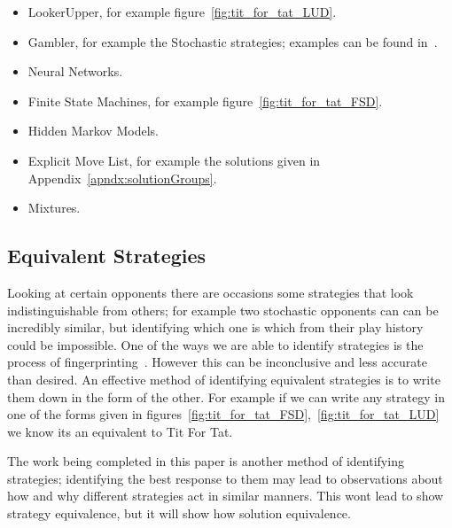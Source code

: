 \begin{itemize}
 \item LookerUpper, for example figure~\ref{fig:tit_for_tat_LUD}.
 \item Gambler, for example the Stochastic strategies; examples can be found in~\cite{press2012iterated}.
 \item Neural Networks.
 \item Finite State Machines, for example figure~\ref{fig:tit_for_tat_FSD}.
 \item Hidden Markov Models.
 \item Explicit Move List, for example the solutions given in Appendix~\ref{apndx:solutionGroups}.
 \item Mixtures.
\end{itemize}

\subsection{Equivalent Strategies}\label{subsec:equivalentStrategies}
Looking at certain opponents there are occasions some strategies that look indistinguishable from others;
for example two stochastic opponents can can be incredibly similar, but identifying which one is which from their play history could be impossible.
One of the ways we are able to identify strategies is the process of fingerprinting~\cite{Ashlock2004,Ashlock2008,cambell2016thesis}.
However this can be inconclusive and less accurate than desired.
An effective method of identifying equivalent strategies is to write them down in the form of the other.
For example if we can write any strategy in one of the forms given in figures~\ref{fig:tit_for_tat_FSD},~\ref{fig:tit_for_tat_LUD} we know its an equivalent to Tit For Tat.

The work being completed in this paper is another method of identifying strategies; identifying the best response to them may lead to observations about how and why different strategies act in similar manners.
This wont lead to show strategy equivalence, but it will show how solution equivalence.

